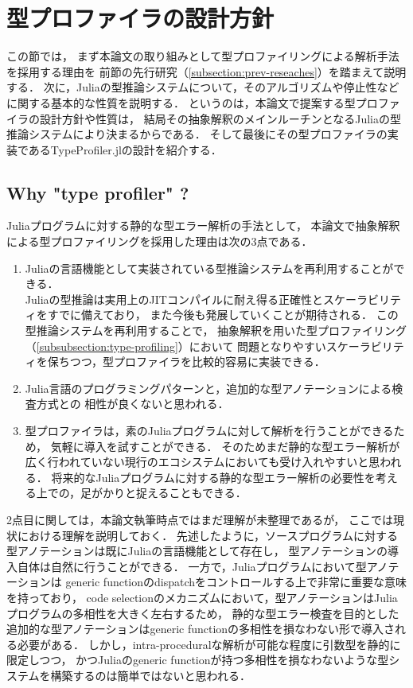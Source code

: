 
\section{型プロファイラの設計方針} \label{section:3}

この節では，
まず本論文の取り組みとして型プロファイリングによる解析手法を採用する理由を
前節の先行研究（\ref{subsection:prev-reseaches}）を踏まえて説明する．
次に，Juliaの型推論システムについて，そのアルゴリズムや停止性などに関する基本的な性質を説明する．
というのは，本論文で提案する型プロファイラの設計方針や性質は，
結局その抽象解釈のメインルーチンとなるJuliaの型推論システムにより決まるからである．
そして最後にその型プロファイラの実装であるTypeProfiler.jlの設計を紹介する．

\subsection{Why "type profiler" ?}

Juliaプログラムに対する静的な型エラー解析の手法として，
本論文で抽象解釈による型プロファイリングを採用した理由は次の3点である．

\begin{enumerate}
  \item Juliaの言語機能として実装されている型推論システムを再利用することができる．\\
        Juliaの型推論は実用上のJITコンパイルに耐え得る正確性とスケーラビリティをすでに備えており，
        また今後も発展していくことが期待される．
        この型推論システムを再利用することで，
        抽象解釈を用いた型プロファイリング（\ref{subsubsection:type-profiling}）において
        問題となりやすいスケーラビリティを保ちつつ，型プロファイラを比較的容易に実装できる．
　\item Julia言語のプログラミングパターンと，追加的な型アノテーションによる検査方式との
        相性が良くないと思われる．
  \item 型プロファイラは，素のJuliaプログラムに対して解析を行うことができるため，
        気軽に導入を試すことができる．
        そのためまだ静的な型エラー解析が広く行われていない現行のエコシステムにおいても受け入れやすいと思われる．
        将来的なJuliaプログラムに対する静的な型エラー解析の必要性を考える上での，足がかりと捉えることもできる．
\end{enumerate}

2点目に関しては，本論文執筆時点ではまだ理解が未整理であるが，
ここでは現状における理解を説明しておく．
先述したように，ソースプログラムに対する型アノテーションは既にJuliaの言語機能として存在し，
型アノテーションの導入自体は自然に行うことができる．
一方で，Juliaプログラムにおいて型アノテーションは
generic functionのdispatchをコントロールする上で非常に重要な意味を持っており，
code selectionのメカニズムにおいて，型アノテーションはJuliaプログラムの多相性を大きく左右する\footnotemark ため，
静的な型エラー検査を目的とした追加的な型アノテーションはgeneric functionの多相性を損なわない形で導入される必要がある．
しかし，intra-proceduralな解析が可能な程度に引数型を静的に限定しつつ，
かつJuliaのgeneric functionが持つ多相性を損なわないような型システムを構築するのは簡単ではないと思われる．

